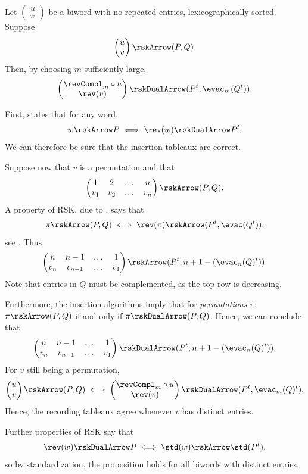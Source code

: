 \begin{proposition}

Let $\left(\begin{smallmatrix} u \\ v \end{smallmatrix} \right)$
be a biword with no repeated entries, lexicographically sorted.
Suppose
\[
\begin{pmatrix}
u \\
v
\end{pmatrix}
\rskArrow (P,Q).
\]
Then, by choosing $m$ sufficiently large,
\[
\begin{pmatrix}
\revCompl_m \circ u \\
\rev(v)
\end{pmatrix}
\rskDualArrow (P^t,\evac_m(Q^t)).
\]
\end{proposition}
\begin{proof*}
First, \cite[Prop.~2.3.14]{Butler1994} states that for any word,
\[
w \rskArrow P \iff \rev(w) \rskDualArrow P^t.
\]
We can therefore be sure that the insertion tableaux are correct.

Suppose now that $v$ is a permutation and that
\[
\begin{pmatrix}
1 & 2 & \dotsc & n \\
v_1 & v_2 & \dotsc & v_n
\end{pmatrix} \rskArrow (P,Q).
\]
A property of RSK, due to ,
says that
\[
\pi \rskArrow (P,Q) \iff \rev(\pi) \rskArrow (P^t,\evac(Q^t)),
\]
see \cite[Thm.~4.1.1]{Leeuwen1996}.
Thus
\[
\begin{pmatrix}
n & n-1 & \dotsc & 1 \\
v_n & v_{n-1} & \dotsc & v_1
\end{pmatrix} \rskArrow (P^t, n+1-(\evac_n(Q)^t)).
\]
Note that entries in $Q$ must be complemented, as the top row is decreasing.

Furthermore, the insertion algorithms imply that for \emph{permutations} $\pi$,
$\pi \rskArrow (P,Q)$ if and only if $\pi \rskDualArrow (P,Q)$.
Hence, we can conclude that
\[
\begin{pmatrix}
n & n-1 & \dotsc & 1 \\
v_n & v_{n-1} & \dotsc & v_1
\end{pmatrix} \rskDualArrow (P^t, n+1-(\evac_n(Q)^t)).
\]
For $v$ still being a permutation,
\[
\begin{pmatrix}
u \\
v
\end{pmatrix} \rskArrow (P,Q)
\iff
\begin{pmatrix}
\revCompl_m \circ u \\
\rev(v)
\end{pmatrix} \rskDualArrow (P^t, \evac_m(Q)^t).
\]
Hence, the recording tableaux agree whenever $v$ has distinct entries.

Further properties of RSK say that
\[
\rev(w) \rskDualArrow P \iff \std(w) \rskArrow \std(P^t),
\]
so by standardization, the proposition holds for all biwords
with distinct entries.
\end{proof*}




